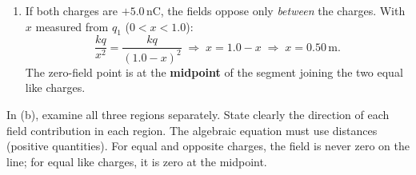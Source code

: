 \documentclass[11pt]{article}
\begin{document}
\begin{corrige}
\begin{enumerate}
\begin{itemize}
\end{itemize}
\textbf{Conclusion:} For two charges of equal magnitude and opposite sign, there is \emph{no} point on the line joining them where the electric field is zero.
\item If both charges are $+5.0\,\mathrm{nC}$, the fields oppose only \emph{between} the charges. With $x$ measured from $q_{1}$ ($0 < x < 1.0$):
\[
\frac{kq}{x^{2}} = \frac{kq}{(1.0 - x)^{2}} \;\Rightarrow\; x = 1.0 - x \;\Rightarrow\; x = 0.50\,\mathrm{m}.
\]
The zero-field point is at the \textbf{midpoint} of the segment joining the two equal like charges.
\end{enumerate}
\end{corrige}

\begin{attention}
In (b), examine all three regions separately. State clearly the direction of each field contribution in each region. The algebraic equation must use distances (positive quantities). For equal and opposite charges, the field is never zero on the line; for equal like charges, it is zero at the midpoint.
\end{attention}
\end{document}
